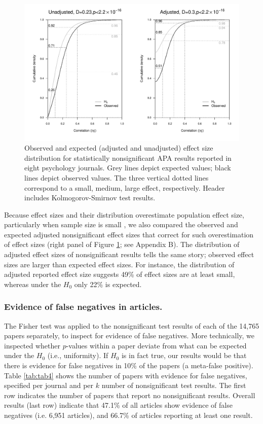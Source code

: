 \documentclass{article}
\begin{document}
\begin{figure}
\begin{center}
\includegraphics[width=\textwidth]{../figures/Fig3.pdf}
\end{center}
\caption{Observed and expected (adjusted and unadjusted) effect size distribution for statistically nonsignificant APA results reported in eight psychology journals. Grey lines depict expected values; black lines depict observed values. The three vertical dotted lines correspond to a small, medium, large effect, respectively. Header includes Kolmogorov-Smirnov test results.}
\label{fig:fig3}
\end{figure}

Because effect sizes and their distribution overestimate population effect size, particularly when sample size is small \cite{Voelkle2007-at,Hedges1981-og}, we also compared the observed and expected adjusted nonsignificant effect sizes that correct for such overestimation of effect sizes (right panel of Figure \ref{fig:fig3}; see Appendix B). The distribution of adjusted effect sizes of nonsignificant results tells the same story; observed effect sizes are larger than expected effect sizes. For instance, the distribution of adjusted reported effect size suggests 49\% of effect sizes are at least small, whereas under the $H_0$ only 22\% is expected.

\subsubsection*{Evidence of false negatives in articles.}


The Fisher test was applied to the nonsignificant test results of each of the 14,765 papers separately, to inspect for evidence of false negatives. More technically, we inspected whether $p$-values within a paper deviate from what can be expected under the $H_0$ (i.e., uniformity). If $H_0$ is in fact true, our results would be that there is evidence for false negatives in 10\% of the papers (a meta-false positive). Table \ref{tab:tab4} shows the number of papers with evidence for false negatives, specified per journal and per $k$ number of nonsignificant test results. The first row indicates the number of papers that report no nonsignificant results. Overall results (last row) indicate that 47.1\% of all articles show evidence of false negatives (i.e. 6,951 articles), and 66.7\% of articles reporting at least one result.
\end{document}
